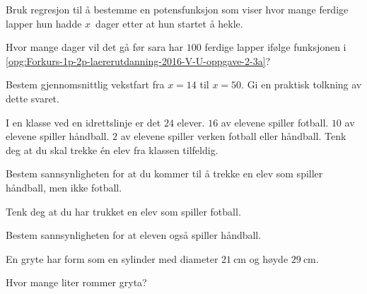 \begin{oppgaver}
   Bruk regresjon til å bestemme en potensfunksjon som viser hvor mange
  ferdige lapper hun hadde $x$~dager etter at hun startet å hekle.
  \label{opg:Forkurs-1p-2p-laererutdanning-2016-V-U-oppgave-2-3a}
\end{oppgaver}

\begin{oppgaver}
   Hvor mange dager vil det gå før sara har $100$ ferdige lapper ifølge
  funksjonen i \cref{opg:Forkurs-1p-2p-laererutdanning-2016-V-U-oppgave-2-3a}?
\end{oppgaver}

\begin{oppgaver}
   Bestem gjennomsnittlig vekstfart fra $x=14$ til $x=50$. Gi en
  praktisk tolkning av dette svaret.
\end{oppgaver}


\Oppgave[3]

I en klasse ved en idrettslinje er det $24$ elever. $16$ av elevene spiller
fotball. $10$ av elevene spiller håndball. $2$ av elevene spiller verken
fotball eller håndball. Tenk deg at du skal trekke én elev fra klassen
tilfeldig.

\begin{oppgaver}
   Bestem sannsynligheten for at du kommer til å trekke en elev som
  spiller håndball, men ikke fotball.
\end{oppgaver}

Tenk deg at du har trukket en elev som spiller fotball.

\begin{oppgaver}
   Bestem sannsynligheten for at eleven også spiller håndball.
\end{oppgaver}


\Oppgave[3]

En gryte har form som en sylinder med diameter $\SI{21}{\centi\metre}$ og høyde
$\SI{29}{\cm}$.

\begin{oppgaver}
   Hvor mange liter rommer gryta?
\end{oppgaver}

